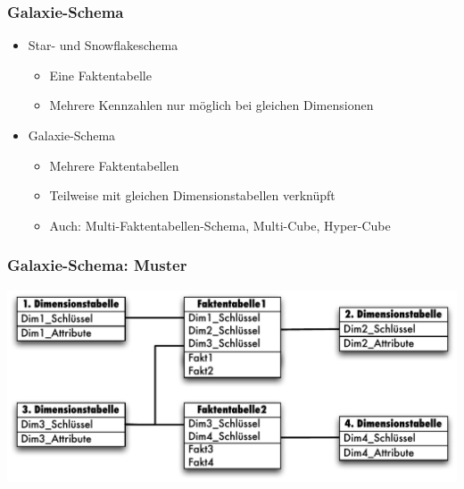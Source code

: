         
                \begin{frame}
        
                \frametitle{Galaxie-Schema}
        
        
                \begin{itemize}
                \item Star- und Snowflakeschema
                  \begin{itemize}
                  \item Eine Faktentabelle
                  \item Mehrere Kennzahlen nur möglich bei gleichen Dimensionen
                  \end{itemize}
                \item Galaxie-Schema
                  \begin{itemize}
                  \item Mehrere Faktentabellen
                  \item Teilweise mit gleichen Dimensionstabellen verknüpft
                  \item Auch: Multi-Faktentabellen-Schema, Multi-Cube, Hyper-Cube
                  \end{itemize}
                \end{itemize}
        
                \end{frame}
        
                \begin{frame}
        
                \frametitle{Galaxie-Schema: Muster}
        
                \begin{center}
                  \includegraphics[width=\textwidth]{fig6/Galaxy-Schema.pdf}
                \end{center}
        
                \end{frame}
        
